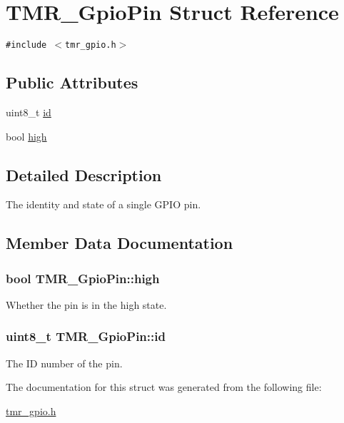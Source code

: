 \hypertarget{struct_t_m_r___gpio_pin}{
\section{TMR\_\-GpioPin Struct Reference}
\label{struct_t_m_r___gpio_pin}
}
{\tt \#include $<$tmr\_\-gpio.h$>$}

\subsection*{Public Attributes}
\begin{CompactItemize}
\item 
uint8\_\-t \hyperlink{struct_t_m_r___gpio_pin_64050054de381df25ab00a3446f27958}{id}
\item 
bool \hyperlink{struct_t_m_r___gpio_pin_5c416f9915d430bbac20fe263fb1ed00}{high}
\end{CompactItemize}


\subsection{Detailed Description}
The identity and state of a single GPIO pin. 

\subsection{Member Data Documentation}
\hypertarget{struct_t_m_r___gpio_pin_5c416f9915d430bbac20fe263fb1ed00}{
\subsubsection[{high}]{\setlength{\rightskip}{0pt plus 5cm}bool {\bf TMR\_\-GpioPin::high}}}
\label{struct_t_m_r___gpio_pin_5c416f9915d430bbac20fe263fb1ed00}


Whether the pin is in the high state. \hypertarget{struct_t_m_r___gpio_pin_64050054de381df25ab00a3446f27958}{
\subsubsection[{id}]{\setlength{\rightskip}{0pt plus 5cm}uint8\_\-t {\bf TMR\_\-GpioPin::id}}}
\label{struct_t_m_r___gpio_pin_64050054de381df25ab00a3446f27958}


The ID number of the pin. 

The documentation for this struct was generated from the following file:\begin{CompactItemize}
\item 
\hyperlink{tmr__gpio_8h}{tmr\_\-gpio.h}\end{CompactItemize}
